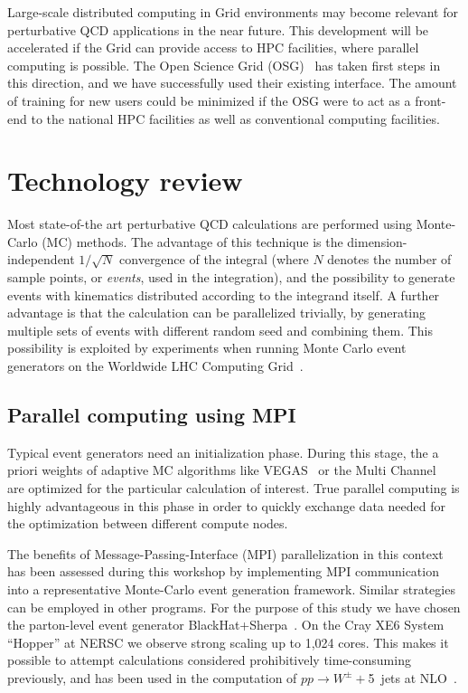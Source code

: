 \documentclass[12pt]{article}
\newcommand{\trademark}{\textsuperscript{\texttrademark}\xspace}
\begin{document}
Large-scale distributed computing in Grid environments 
may become relevant for perturbative QCD applications 
in the near future. This development will be accelerated if the Grid
can provide access to HPC facilities, where parallel 
computing is possible. The Open Science Grid (OSG)~\cite{OSG} has taken 
first steps in this direction, and we have successfully used their
existing interface. The amount of training for new users could be minimized
if the OSG were to act as a front-end to the national HPC facilities
as well as conventional computing facilities.

\section{Technology review}
Most state-of-the art perturbative QCD calculations are performed
using Monte-Carlo (MC) methods. The advantage of this technique
is the dimension-independent $1/\sqrt{N}$ convergence of the integral
(where $N$ denotes the number of sample points, or \textit{events}, 
used in the integration), and the possibility to generate events
with kinematics distributed according to the integrand
itself. A further advantage is that the calculation can be
parallelized trivially, by generating multiple sets of events with
different random seed and combining them. This possibility is
exploited by experiments when running Monte Carlo event generators on
the Worldwide LHC Computing Grid~\cite{WLCG}. 

\subsection{Parallel computing using MPI}
Typical event generators need an initialization phase. During this
stage, the a priori weights of adaptive MC algorithms like
VEGAS~\cite{Lepage:1977sw} or the Multi Channel~\cite{Kleiss:1994qy}
are optimized for the particular calculation of interest. True
parallel computing is highly advantageous in this phase in order to
quickly exchange data needed for the optimization between different
compute nodes.

The benefits of Message-Passing-Interface (MPI) parallelization
in this context has been assessed during this workshop by implementing
MPI communication into a representative Monte-Carlo event generation
framework. Similar strategies can be employed in other programs.  For
the purpose of this study we have chosen the parton-level event generator
BlackHat+Sherpa~\cite{Berger:2008sj,Gleisberg:2003xi,Gleisberg:2008ta}.
On the Cray XE6\trademark System ``Hopper'' at NERSC we observe 
strong scaling up to 1,024 cores. This makes it possible to attempt
calculations considered prohibitively time-consuming previously, 
and has been used in the computation of $pp\to W^\pm+$5~jets 
at NLO~\cite{Bern:2013gka}.
\end{document}
